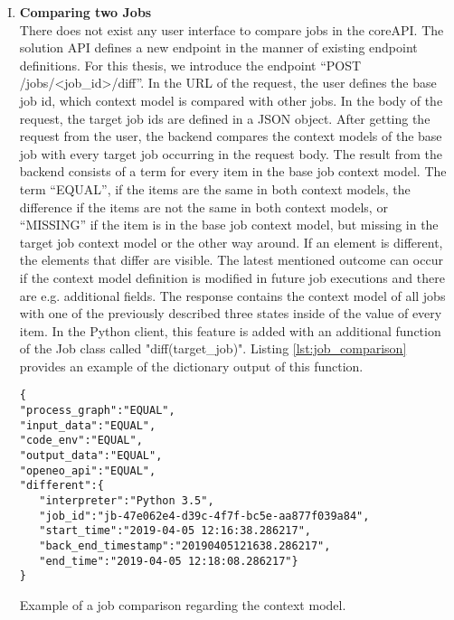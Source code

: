 \documentclass[draft,final]{vutinfth} %
\begin{document}
\begin{enumerate}[I.]
\item \textbf{Comparing two Jobs} \\
	There does not exist any user interface to compare jobs in the coreAPI. The solution API defines a new endpoint in the manner of existing endpoint definitions. For this thesis, we introduce the endpoint  “POST /jobs/<job\_id>/diff”. In the URL of the request, the user defines the base job id, which context model is compared with other jobs. In the body of the request, the target job ids are defined in a JSON object. After getting the request from the user, the backend compares the context models of the base job with every target job occurring in the request body. The result from the backend consists of a term for every item in the base job context model. The term “EQUAL”, if the items are the same in both context models, the difference if the items are not the same in both context models, or “MISSING” if the item is in the base job context model, but missing in the target job context model or the other way around. If an element is different, the elements that differ are visible. The latest mentioned outcome can occur if the context model definition is modified in future job executions and there are e.g. additional fields. The response contains the context model of all jobs with one of the previously described three states inside of the value of every item. In the Python client, this feature is added with an additional function of the Job class called "diff(target\_job)". Listing \ref{lst:job_comparison} provides an example of the dictionary output of this function.
\begin{listing}[ht]
	\begin{verbatim}
{
"process_graph":"EQUAL",
"input_data":"EQUAL",
"code_env":"EQUAL",
"output_data":"EQUAL",
"openeo_api":"EQUAL",
"different":{
   "interpreter":"Python 3.5",
   "job_id":"jb-47e062e4-d39c-4f7f-bc5e-aa877f039a84",
   "start_time":"2019-04-05 12:16:38.286217",
   "back_end_timestamp":"20190405121638.286217",
   "end_time":"2019-04-05 12:18:08.286217"}
}
	\end{verbatim}
	\caption{Example of a job comparison regarding the context model.}
	\label{lst:job_comparison}
\end{listing}	



\end{enumerate}
\end{document}
